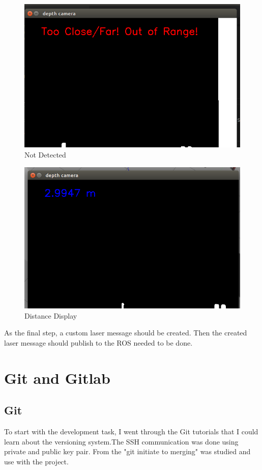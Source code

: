 \documentclass[twoside,12pt,times,onecolumn,a4paper]{report}
\begin{document}
\begin{figure}[!h]
  \centering
   \includegraphics[width=15cm]{depth_output}
  \caption{Not Detected}
\end{figure}

\begin{figure}[!h]
  \centering
   \includegraphics[width=15cm]{depth-out-dist}
  \caption{Distance Display}
\end{figure}

As the final step, a custom laser message should be created. Then the created laser 
message should publish to the ROS needed to be done.

\section{ Git and Gitlab}

\subsection{Git}
To start with the development task, I went through the Git tutorials that I could learn about the versioning system.The SSH communication was done using private and public key pair.  From the "git initiate to merging" was studied and use with the project. 
\end{document}
